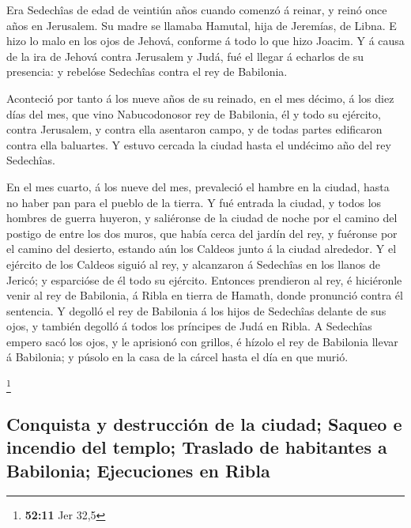  Era Sedechîas de edad de veintiún años cuando comenzó á
reinar, y reinó once años en Jerusalem. Su madre se llamaba Hamutal,
hija de Jeremías, de Libna.  E hizo lo malo en los ojos de
Jehová, conforme á todo lo que hizo Joacim.  Y á causa de
la ira de Jehová contra Jerusalem y Judá, fué el llegar á echarlos de su
presencia: y rebelóse Sedechîas contra el rey de Babilonia.

 Aconteció por tanto á los nueve años de su reinado, en el
mes décimo, á los diez días del mes, que vino Nabucodonosor rey de
Babilonia, él y todo su ejército, contra Jerusalem, y contra ella
asentaron campo, y de todas partes edificaron contra ella baluartes.
 Y estuvo cercada la ciudad hasta el undécimo año del rey
Sedechîas.

 En el mes cuarto, á los nueve del mes, prevaleció el
hambre en la ciudad, hasta no haber pan para el pueblo de la tierra.
 Y fué entrada la ciudad, y todos los hombres de guerra
huyeron, y saliéronse de la ciudad de noche por el camino del postigo de
entre los dos muros, que había cerca del jardín del rey, y fuéronse por
el camino del desierto, estando aún los Caldeos junto á la ciudad
alrededor.  Y el ejército de los Caldeos siguió al rey, y
alcanzaron á Sedechîas en los llanos de Jericó; y esparcióse de él todo
su ejército.  Entonces prendieron al rey, é hiciéronle
venir al rey de Babilonia, á Ribla en tierra de Hamath, donde pronunció
contra él sentencia.  Y degolló el rey de Babilonia á los
hijos de Sedechîas delante de sus ojos, y también degolló á todos los
príncipes de Judá en Ribla.  A Sedechîas empero sacó los
ojos, y le aprisionó con grillos, é hízolo el rey de Babilonia llevar á
Babilonia; y púsolo en la casa de la cárcel hasta el día en que murió.

\footnote{\textbf{52:11} Jer 32,5}

\hypertarget{conquista-y-destrucciuxf3n-de-la-ciudad-saqueo-e-incendio-del-templo-traslado-de-habitantes-a-babilonia-ejecuciones-en-ribla}{%
\subsection{Conquista y destrucción de la ciudad; Saqueo e incendio del
templo; Traslado de habitantes a Babilonia; Ejecuciones en
Ribla}\label{conquista-y-destrucciuxf3n-de-la-ciudad-saqueo-e-incendio-del-templo-traslado-de-habitantes-a-babilonia-ejecuciones-en-ribla}}

